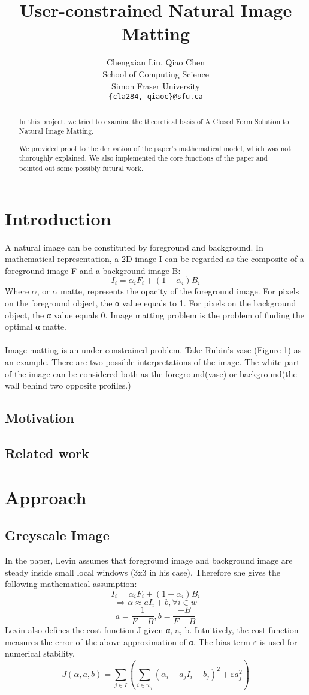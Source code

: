 \documentclass[11pt,letterpaper]{article}
\title{User-constrained Natural Image Matting}
\author{Chengxian Liu, Qiao Chen\\
  School of Computing Science \\ Simon Fraser University \\
  {\tt \{cla284, qiaoc\}@sfu.ca}  
}
\begin{document}
\maketitle
\begin{abstract}
In this project, we tried to examine the theoretical basis of A Closed Form Solution to Natural Image Matting. ~\cite{Levin:2006}

We provided proof to the derivation of the paper’s mathematical model, which was not thoroughly explained. We also implemented the core functions of the paper and pointed out some possibly futural work.
\end{abstract}

\section{Introduction}
A natural image can be constituted by foreground and background. In mathematical representation, a 2D image I can be regarded as the composite of a foreground image F and a background image B:
$$I_{i} = \alpha_{i}F_{i} + (1-\alpha_{i})B_{i}$$
Where $\alpha$, or $\alpha$ matte, represents the opacity of the foreground image. For pixels on the foreground object, the α value equals to 1. For pixels on the background object, the α value equals 0. Image matting problem is the problem of finding the optimal α matte.\\\\
Image matting is an under-constrained problem. Take Rubin’s vase (Figure 1) as an example. There are two possible interpretations of the image. The white part of the image can be considered both as the foreground(vase) or background(the wall behind two opposite profiles.)


\subsection{Motivation}


\subsection{Related work}

\section{Approach}
\subsection{Greyscale Image}
In the paper, Levin assumes that foreground image and background image are steady inside small local windows (3x3 in his case). Therefore she gives the following mathematical assumption:
$$I_i = \alpha_i F_i + (1 - \alpha_i)B_i$$
$$\Rightarrow \alpha \approx aI_{i} + b, \forall i \in w $$
$$a = \frac{1}{F-B}, b = \frac{-B}{F-B} $$
Levin also defines the cost function J given α, a, b. Intuitively, the cost function measures the error of the above approximation of α. The bias term $\varepsilon$ is used for numerical stability.
$$J(\alpha, a, b) = \sum_{j \in I}(\sum_{i \in w_j}(\alpha_i - a_jI_i-b_j)^2+\varepsilon a_j^2)$$
\end{document}
